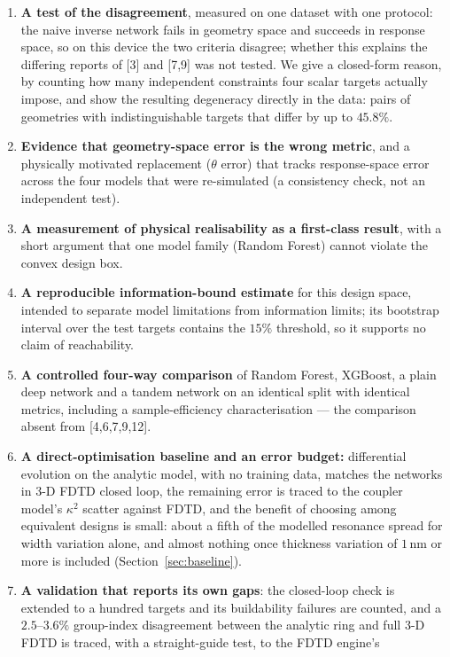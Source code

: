 \documentclass[11pt]{article}
\begin{document}
\begin{enumerate}[leftmargin=1.6em,itemsep=2pt]
\item \textbf{A test of the disagreement}, measured on one dataset with
one protocol: the naive inverse network fails in geometry space and succeeds in response space, so on this device the two criteria disagree; whether this explains the differing reports of [3] and [7,9] was not tested. We give a closed-form reason, by
counting how many independent constraints four scalar targets actually impose, and
show the resulting degeneracy directly in the data: pairs of geometries with
indistinguishable targets that differ by up to $45.8\%$.
\item \textbf{Evidence that geometry-space error is the wrong metric}, and a physically motivated replacement ($\theta$ error) that tracks response-space error across the four models that were re-simulated (a consistency check, not an independent test).
\item \textbf{A measurement of physical realisability as a first-class
result}, with a short argument that one model family (Random Forest) cannot violate the convex design box.
\item \textbf{A reproducible information-bound estimate} for this design space, intended to separate model limitations from information limits; its bootstrap interval over the test targets contains the $15\%$ threshold, so it supports no claim of reachability.
\item \textbf{A controlled four-way comparison} of Random Forest, XGBoost, a
plain deep network and a tandem network on an identical split with identical
metrics, including a sample-efficiency characterisation --- the comparison
absent from [4,6,7,9,12].
\item \textbf{A direct-optimisation baseline and an error budget:} differential
evolution on the analytic model, with no training data, matches the networks in
3-D FDTD closed loop, the remaining error is traced to the coupler model's
$\kappa^2$ scatter against FDTD, and the benefit of choosing among equivalent designs is small: about a fifth of the modelled resonance spread for width variation alone, and almost nothing once thickness variation of $1$\,nm or more is included (Section~\ref{sec:baseline}).
\item \textbf{A validation that reports its own gaps}: the closed-loop check
is extended to a hundred targets and its buildability failures are counted, and
a $2.5$--$3.6\%$ group-index disagreement between the analytic ring and
full 3-D FDTD is traced, with a straight-guide test, to the FDTD engine's

\end{enumerate}
\end{document}
